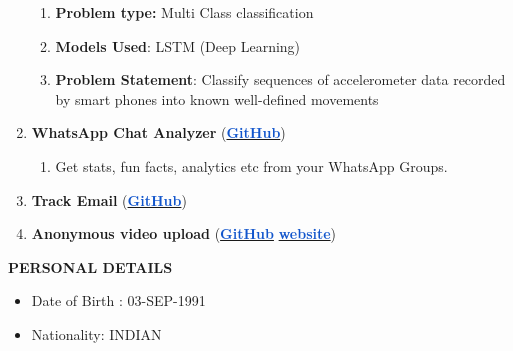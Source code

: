 \documentclass[12pt]{article}
\begin{document}
\begin{enumerate}
\begin{enumerate}
	\item \textbf{Problem type: }Multi Class classification\par

	\item \textbf{Models Used}: LSTM (Deep Learning)\par

	\item \textbf{Problem Statement}: Classify sequences of accelerometer data recorded by smart phones into known well-defined movements\\
\par


\end{enumerate}
	\item {\fontsize{14pt}{16.8pt}\selectfont \textbf{WhatsApp Chat Analyzer}}
	(\href{https://github.com/sachinkalsi/whatsapp-chat-analyser}{\textbf{\textcolor[HTML]{1155CC}{GitHub}}})

\begin{enumerate}

\item {Get stats, fun facts, analytics etc from your WhatsApp Groups.}

\end{enumerate}

	\item {\fontsize{14pt}{16.8pt}\selectfont \textbf{Track Email}}
	(\href{https://github.com/sachinkalsi/track-email}{\textbf{\textcolor[HTML]{1155CC}{GitHub}}})
	
\par

	\item {\fontsize{14pt}{16.8pt}\selectfont \textbf{\textbf{Anonymous video upload}}}
(\href{https://github.com/sachinkalsi/video-upload-and-video-streaming}{\textbf{\textcolor[HTML]{1155CC}{GitHub}}}\text{,} \href{http://guarded-earth-63038.herokuapp.com/}{\textbf{\textcolor[HTML]{1155CC}{website}}})
	

\end{enumerate}\par


\vspace{\baselineskip}
\begin{FlushLeft}
{\fontsize{14pt}{16.8pt}\selectfont \textbf{PERSONAL DETAILS}\par}
\end{FlushLeft}\par

\begin{itemize}
	\item Date of Birth : 03-SEP-1991\par

	\item Nationality: INDIAN
\end{itemize}\par
\end{document}
